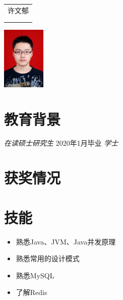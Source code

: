 \documentclass{resume}
\begin{document}

\medskip\noindent
\begin{minipage}{0.7\textwidth}
  \Large{
    \begin{tabu}  { l }
      \scshape{许文郁} \\
       \\
       \\
    \end{tabu}
  }
\end{minipage}
\begin{minipage}{0.3\textwidth}
  \raggedleft
  \includegraphics[height=30mm]{me}
\end{minipage}

\section{教育背景}
\textit{在读硕士研究生} {2020年1月毕业}
\textit{学士}

\section{获奖情况}

\section{技能}
\begin{itemize}[parsep=0.5ex]
  \item 熟悉Java、JVM、Java并发原理
  \item 熟悉常用的设计模式
  \item 熟悉MySQL
  \item 了解Redis
\end{itemize}
\end{document}
